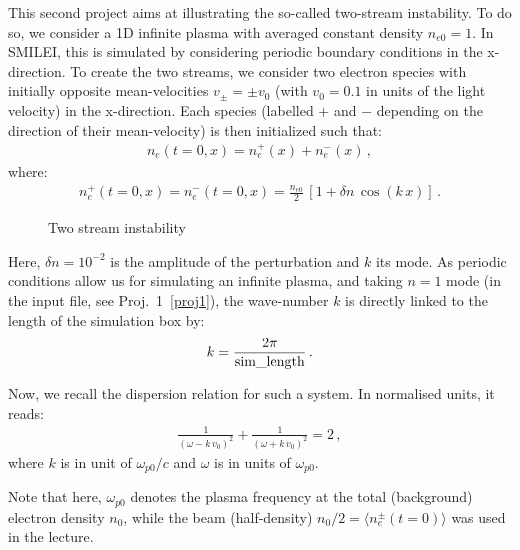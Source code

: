 \documentclass[11pt,a4paper]{article}
\begin{document}
This second project aims at illustrating the so-called two-stream instability.
To do so, we consider a 1D infinite plasma with averaged constant density $n_{e0} = 1$. 
In SMILEI, this is simulated by considering periodic boundary conditions in the x-direction. 
To create the two streams, we consider two electron species with initially opposite mean-velocities $v_{\pm} = \pm v_0$ (with $v_0 = 0.1$ in units of the light velocity) in the x-direction.
Each species (labelled $+$ and $-$ depending on the direction of their mean-velocity) is then initialized such that:
\begin{eqnarray*}
n_e(t=0,x) = n_e^+(x) + n_e^-(x)\,,
\end{eqnarray*}
where:
\begin{eqnarray*}
n_e^+(t=0,x) = n_e^-(t=0,x) = \frac{n_{e0}}{2}\,\left[1 + \delta n\,\cos(k\,x)\right]\,.
\end{eqnarray*}

\begin{wrapfigure}[15]{r}{0.4\textwidth}
\def\svgwidth{\linewidth}

\label{Fig_2stream.pdf}
\caption{Two stream instability}
\label{Fig_2stream}
\end{wrapfigure}

Here, $\delta n = 10^{-2}$ is the amplitude of the perturbation and $k$ its mode.
As periodic conditions allow us for simulating an infinite plasma, and taking $n=1$ mode  (in the input file, see Proj.~1~\ref{proj1}), the wave-number $k$ is directly linked to the length of the simulation box by:
\begin{eqnarray}\label{eq_k}
k = \frac{2\pi}{\rm sim\_length}\,.
\end{eqnarray}


Now, we recall the dispersion relation for such a system. In normalised units, it reads:
\begin{eqnarray}\label{eq_disprel_2stream}
\frac{1}{(\omega - k\,v_0)^2} + \frac{1}{(\omega + k\,v_0)^2} = 2\,,
\end{eqnarray}
where $k$ is in unit of $\omega_{p0}/c$ and $\omega$ is in units of $\omega_{p0}$.


Note that here, $\omega_{p0}$ denotes the plasma frequency at the total (background) electron density $n_0$, while the beam (half-density) $n_0/2 = \langle n_e^{\pm}(t=0) \rangle$ was used in the lecture.
\end{document}
